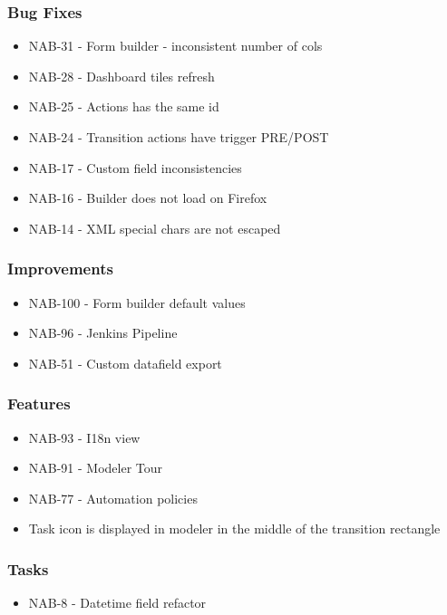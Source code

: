   \subsubsection*{Bug Fixes}
    \begin{itemize}
      \item NAB-31 - Form builder - inconsistent number of cols
      \item NAB-28 - Dashboard tiles refresh
      \item NAB-25 - Actions has the same id
      \item NAB-24 - Transition actions have trigger PRE/POST
      \item NAB-17 - Custom field inconsistencies
      \item NAB-16 - Builder does not load on Firefox
      \item NAB-14 - XML special chars are not escaped
    \end{itemize}

  \subsubsection*{Improvements}
    \begin{itemize}
      \item NAB-100 - Form builder default values
      \item NAB-96 - Jenkins Pipeline
      \item NAB-51 - Custom datafield export
    \end{itemize}

  \subsubsection*{Features}
    \begin{itemize}
      \item NAB-93 - I18n view
      \item NAB-91 - Modeler Tour
      \item NAB-77 - Automation policies
      \item Task icon is displayed in modeler in the middle of the transition rectangle
    \end{itemize}

  \subsubsection*{Tasks}
    \begin{itemize}
      \item NAB-8 - Datetime field refactor
    \end{itemize}

